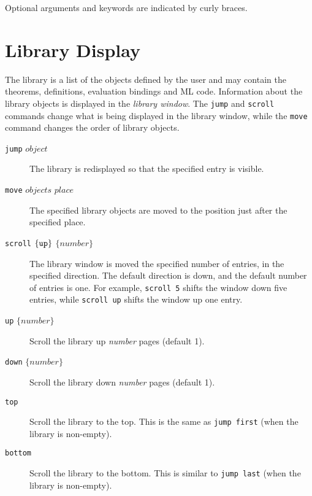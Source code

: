 \noindent
Optional arguments and keywords are indicated by curly braces.

\section{Library Display}


The library is a list of the objects defined by the user
and may contain
the theorems, definitions, evaluation bindings and ML code.
Information about the library objects is displayed in the
{\em library{} window\/}.
The {\tt jump} and {\tt scroll} commands change what is being
displayed in the library window, while
the {\tt move} command changes the order of library objects.

\begin {description}
\item[{\tt jump} $object$]{} \hfill \break \noindent {}
    The library is redisplayed so that the specified entry is visible.

\item[{\tt move} $objects$ $place$]{} \hfill \break \noindent
    {}
    The specified library objects are moved to the position just after the
    specified place.

\item[{\tt scroll} \(\{{\tt up}\}\) \(\{number\}\)]{} \hfill \break
    \noindent {}
    The library window is moved the specified number of entries, in the
    specified direction.
    The default direction is down, and the default number of entries is one.
    For example, {\tt scroll 5} shifts the window down five entries, while
    {\tt scroll up} shifts the window up one entry.

\item[{\tt up} \(\{number\}\)]{} \hfill \break \noindent {}
Scroll the library up {\em number} pages (default 1).

\item[{\tt down} \(\{number\}\)]{} \hfill \break \noindent {}
Scroll the library down {\em number} pages (default 1).

\item[{\tt top}]{} \hfill \break \noindent {}
Scroll the library to the top.  This is the same as {\tt jump first}
(when the library is non-empty).

\item[{\tt bottom}]{} \hfill \break \noindent {}
Scroll the library to the bottom.  This is similar to {\tt jump last}
(when the library is non-empty).

\end {description}

